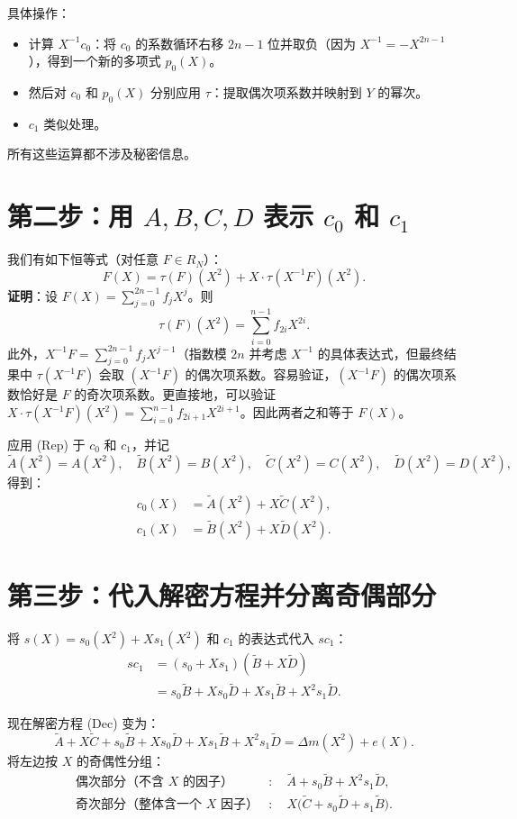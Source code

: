 \documentclass{article}
\begin{document}
具体操作：
\begin{itemize}
  \item 计算 $X^{-1} c_0$：将 $c_0$ 的系数循环右移 $2n-1$ 位并取负（因为 $X^{-1} = -X^{2n-1}$），得到一个新的多项式 $p_0(X)$。
  \item 然后对 $c_0$ 和 $p_0(X)$ 分别应用 $\tau$：提取偶次项系数并映射到 $Y$ 的幂次。
  \item $c_1$ 类似处理。
\end{itemize}
所有这些运算都不涉及秘密信息。

\section{第二步：用 $A,B,C,D$ 表示 $c_0$ 和 $c_1$}

我们有如下恒等式（对任意 $F \in R_N$）：
\[
F(X) = \tau(F)(X^2) + X \cdot \tau(X^{-1}F)(X^2).
\tag{Rep}
\]
\textbf{证明}：设 $F(X) = \sum_{j=0}^{2n-1} f_j X^j$。则
\[
\tau(F)(X^2) = \sum_{i=0}^{n-1} f_{2i} X^{2i}.
\]
此外，$X^{-1}F = \sum_{j=0}^{2n-1} f_j X^{j-1}$（指数模 $2n$ 并考虑 $X^{-1}$ 的具体表达式，但最终结果中 $\tau(X^{-1}F)$ 会取 $(X^{-1}F)$ 的偶次项系数。容易验证，$(X^{-1}F)$ 的偶次项系数恰好是 $F$ 的奇次项系数。更直接地，可以验证 $X \cdot \tau(X^{-1}F)(X^2) = \sum_{i=0}^{n-1} f_{2i+1} X^{2i+1}$。因此两者之和等于 $F(X)$。

应用 (Rep) 于 $c_0$ 和 $c_1$，并记
\[
\tilde{A}(X^2) = A(X^2),\quad \tilde{B}(X^2)=B(X^2),\quad \tilde{C}(X^2)=C(X^2),\quad \tilde{D}(X^2)=D(X^2),
\]
得到：
\begin{align}
c_0(X) &= \tilde{A}(X^2) + X \tilde{C}(X^2), \label{eq:c0} \\
c_1(X) &= \tilde{B}(X^2) + X \tilde{D}(X^2). \label{eq:c1}
\end{align}

\section{第三步：代入解密方程并分离奇偶部分}

将 $s(X) = s_0(X^2) + X s_1(X^2)$ 和 $c_1$ 的表达式代入 $s c_1$：
\begin{align}
s c_1 &= (s_0 + X s_1)(\tilde{B} + X \tilde{D}) \\
&= s_0 \tilde{B} + X s_0 \tilde{D} + X s_1 \tilde{B} + X^2 s_1 \tilde{D}.
\end{align}

现在解密方程 (Dec) 变为：
\[
\tilde{A} + X \tilde{C} + s_0 \tilde{B} + X s_0 \tilde{D} + X s_1 \tilde{B} + X^2 s_1 \tilde{D}
= \Delta m(X^2) + e(X).
\]
将左边按 $X$ 的奇偶性分组：
\begin{align}
\text{偶次部分（不含 $X$ 的因子）}&: \quad \tilde{A} + s_0 \tilde{B} + X^2 s_1 \tilde{D}, \\
\text{奇次部分（整体含一个 $X$ 因子）}&: \quad X \big( \tilde{C} + s_0 \tilde{D} + s_1 \tilde{B} \big).
\end{align}
\end{document}
